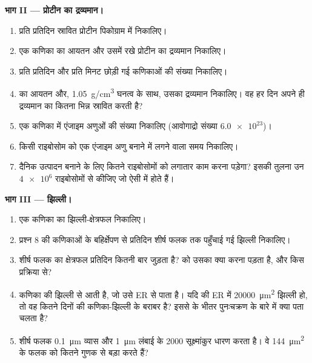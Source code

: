 \begin{problem}
\medskip
\noindent\textbf{भाग II --- प्रोटीन का द्रव्यमान।}
\begin{enumerate}[resume]
  \item प्रति  प्रतिदिन स्रावित प्रोटीन पिकोग्राम में निकालिए।
  \item एक कणिका का आयतन और उसमें रखे प्रोटीन का द्रव्यमान निकालिए।
  \item प्रति  प्रतिदिन और प्रति मिनट छोड़ी गई कणिकाओं की संख्या
        निकालिए।
  \item {} का आयतन और, \qty{1.05}{g/cm^3} घनत्व के साथ, उसका
        द्रव्यमान निकालिए। वह हर दिन अपने ही द्रव्यमान का कितना भिन्न
        स्रावित करती है?
  \item एक कणिका में एंजाइम अणुओं की संख्या निकालिए (आवोगाद्रो संख्या
        $\num{6.0e23}$)।
  \item किसी राइबोसोम को एक एंजाइम अणु बनाने में लगने वाला समय
        निकालिए।
  \item दैनिक उत्पादन बनाने के लिए कितने राइबोसोमों को लगातार काम करना
        पड़ेगा? इसकी तुलना उन $\num{4e6}$ राइबोसोमों से कीजिए जो ऐसी
         में होते हैं।
\end{enumerate}

\medskip
\noindent\textbf{भाग III --- झिल्ली।}
\begin{enumerate}[resume]
  \item एक कणिका का झिल्ली-क्षेत्रफल निकालिए।
  \item प्रश्न 8 की कणिकाओं के बहिर्क्षेपण से प्रतिदिन शीर्ष फलक तक
        पहुँचाई गई झिल्ली निकालिए।
  \item शीर्ष फलक का क्षेत्रफल प्रतिदिन कितनी बार जुड़ता है?  को
        उसका क्या करना पड़ता है, और किस प्रक्रिया से?
  \item कणिका की झिल्ली  से आती है, जो उसे ER से पाता है। यदि
         की ER में \qty{20000}{\micro m^2} झिल्ली हो, तो वह कितने
        दिनों की कणिका-झिल्ली के बराबर है? इससे  के भीतर
        पुनःचक्रण के बारे में क्या पता चलता है?
  \item शीर्ष फलक \qty{0.1}{\micro m} व्यास और \qty{1}{\micro m} लंबाई
        के \qty{2000}{} सूक्ष्मांकुर धारण करता है। वे
        \qty{144}{\micro m^2} के फलक को कितने गुणक से बड़ा करते हैं?
\end{enumerate}


\end{problem}
